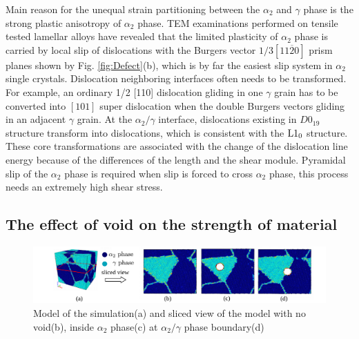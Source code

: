 \documentclass[materials,article,submit,moreauthors,pdftex,10pt,a4paper]{Definitions/mdpi}
\begin{document}
Main reason for the unequal strain partitioning between the $\alpha_2$ and $\gamma$ phase is  the strong plastic anisotropy of  $\alpha_2$ phase. TEM examinations performed on tensile tested lamellar alloys have revealed that the limited plasticity of  $\alpha_2$ phase is carried by local slip of dislocations with the Burgers vector $1/3[11\overline{2}0]$ prism planes shown by Fig. \ref{fig:Defect}(b), which is by far the easiest slip system in $\alpha_2$ single crystals.  Dislocation neighboring interfaces often needs to be transformed. For example, an ordinary 1/2 [110] dislocation gliding in one $\gamma$ grain has to be converted into $[101]$ super dislocation when the double Burgers vectors gliding in an adjacent $\gamma$ grain. At the $\alpha_2/\gamma$ interface, dislocations existing in  $D0_{19}$ structure  transform into dislocations, which is consistent with the $\rm{L1_0}$ structure. These core transformations are associated with the change of the dislocation line energy because of the differences of the length and the shear module.  Pyramidal slip of the $\alpha_2$ phase is required  when slip is forced to cross $\alpha_2$ phase, this process needs an extremely high shear stress.


\subsection{The effect of void on the strength of material}

\begin{figure}[ht]
	\centering
	\includegraphics[width=1\linewidth]{img/slice-view}
	\caption{Model of the simulation(a) and sliced view of the model with no void(b), inside $\alpha_2$ phase(c) at $\alpha_2 / \gamma$ phase boundary(d)}
	\label{fig:model-creation}
\end{figure}
\end{document}
